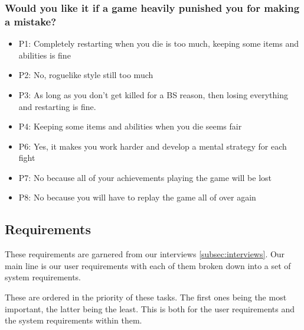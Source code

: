 \documentclass{article}
\begin{document}
\subsubsection*{Would you like it if a game heavily punished you for making a mistake?}
\begin{itemize}
	\item P1: Completely restarting when you die is too much, keeping some items and abilities is fine
	\item P2: No, roguelike style still too much
	\item P3: As long as you don’t get killed for a BS reason, then losing everything and restarting is fine.
	\item P4: Keeping some items and abilities when you die seems fair
	\item P6: Yes, it makes you work harder and develop a mental strategy for each fight
	\item P7: No because all of your achievements playing the game will be lost
	\item P8: No because you will have to replay the game all of over again
\end{itemize}

\subsection{Requirements}%
\label{subsec:ureqs}
These requirements are garnered from our interviews \ref{subsec:interviews}. Our main line is our user
requirements with each of them broken down into a set of system requirements.

These are ordered in the priority of these tasks. The first ones being the most
important, the latter being the least. This is both for the user requirements
and the system requirements within them.

\end{document}
